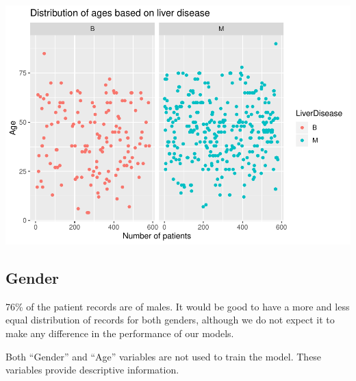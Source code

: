 \documentclass[]{article}
\newenvironment{Shaded}{\begin{snugshade}}{\end{snugshade}}
\newcommand{\CommentTok}[1]{\textcolor[rgb]{0.56,0.35,0.01}{\textit{#1}}}
\newcommand{\DataTypeTok}[1]{\textcolor[rgb]{0.13,0.29,0.53}{#1}}
\newcommand{\KeywordTok}[1]{\textcolor[rgb]{0.13,0.29,0.53}{\textbf{#1}}}
\newcommand{\NormalTok}[1]{#1}
\newcommand{\OperatorTok}[1]{\textcolor[rgb]{0.81,0.36,0.00}{\textbf{#1}}}
\newcommand{\StringTok}[1]{\textcolor[rgb]{0.31,0.60,0.02}{#1}}
\begin{document}
\begin{Shaded}
\end{Shaded}

\includegraphics{LiverDisease_files/figure-latex/unnamed-chunk-12-1.pdf}

\subsection{Gender}

76\% of the patient records are of males. It would be good to have a
more and less equal distribution of records for both genders, although
we do not expect it to make any difference in the performance of our
models.

Both ``Gender'' and ``Age'' variables are not used to train the model.
These variables provide descriptive information.
\end{document}
